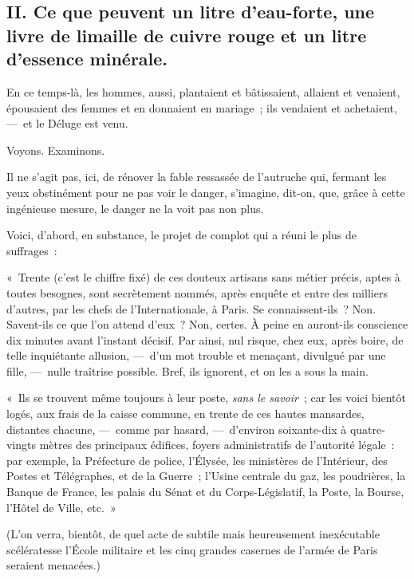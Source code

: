 \documentclass[french,twoside]{book} %
\newcommand{\bibl}[1]{{\RaggedLeft{#1}\par\bigskip}}
\begin{document}
 \subsection[{II. Ce que peuvent un litre d’eau-forte, une livre de limaille de cuivre rouge et un litre d’essence minérale.}]{II. Ce que peuvent un litre d’eau-forte, une livre de limaille de cuivre rouge et un litre d’essence minérale.}
\noindent En ce temps-là, les hommes, aussi, plantaient et bâtissaient, allaient et venaient, épousaient des femmes et en donnaient en mariage ; ils vendaient et achetaient, — et le Déluge est venu.\par

\bibl{Évangiles.}
\noindent Voyons. Examinons.\par
Il ne s’agit pas, ici, de rénover la fable ressassée de l’autruche qui, fermant les yeux obstinément pour ne pas voir le danger, s’imagine, dit-on, que, grâce à cette ingénieuse mesure, le danger ne la voit pas non plus.\par
Voici, d’abord, en substance, le projet de complot qui a réuni le plus de suffrages :\par
« Trente (c’est le chiffre fixé) de ces douteux artisans sans métier précis, aptes à toutes besognes, sont secrètement nommés, après enquête et entre des milliers d’autres, par les   chefs de l’Internationale, à Paris. Se connaissent-ils ? Non. Savent-ils ce que l’on attend d’eux ? Non, certes. À peine en auront-ils conscience dix minutes avant l’instant décisif. Par ainsi, nul risque, chez eux, après boire, de telle inquiétante allusion, — d’un mot trouble et menaçant, divulgué par une fille, — nulle traîtrise possible. Bref, ils ignorent, et on les a sous la main.\par
« Ils se trouvent même toujours à leur poste, \emph{sans le savoir} ; car les voici bientôt logés, aux frais de la caisse commune, en trente de ces hautes mansardes, distantes chacune, — comme par hasard, — d’environ soixante-dix à quatre-vingts mètres des principaux édifices, foyers administratifs de l’autorité légale : par exemple, la Préfecture de police, l’Élysée, les ministères de l’Intérieur, des Postes et Télégraphes, et de la Guerre ; l’Usine centrale du gaz, les poudrières, la Banque de France, les palais du Sénat et du Corps-Législatif, la Poste, la Bourse, l’Hôtel de Ville, etc. »\par
(L’on verra, bientôt, de quel acte de subtile   mais heureusement inexécutable scélératesse l’École militaire et les cinq grandes casernes de l’armée de Paris seraient menacées.)\par
\end{document}

